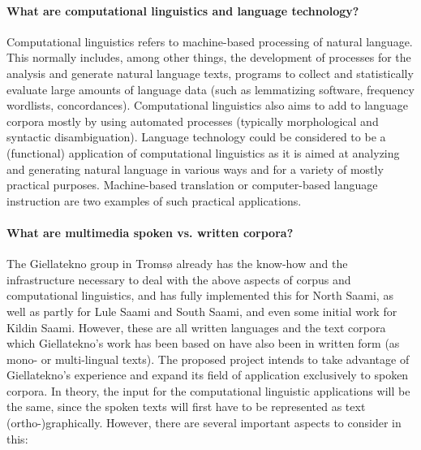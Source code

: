\documentclass[a4paper,12pt]{article}
\begin{document}
\paragraph{What are computational linguistics and language technology?} Computational linguistics refers to machine-based processing of natural language. This normally includes, among other things, the development of processes for the analysis and generate natural language texts, programs to collect and statistically evaluate large amounts of language data (such as lemmatizing software, frequency wordlists, concordances). Computational linguistics also aims to add to language corpora mostly by using automated processes (typically morphological and syntactic disambiguation). Language technology could be considered to be a (functional) application of computational linguistics as it is aimed at analyzing and generating natural language in various ways and for a variety of mostly practical purposes. Machine-based translation or computer-based language instruction are two examples of such practical applications.
 
\paragraph{What are multimedia spoken vs. written corpora?}
The Giellatekno group in Tromsø already has the know-how and the infrastructure necessary to deal with the above aspects of corpus and computational linguistics, and has fully implemented this for North Saami, as well as partly for Lule Saami and South Saami, and even some initial work for Kildin Saami. However, these are all written languages and the text corpora which Giellatekno's work has been based on have also been in written form (as mono- or multi-lingual texts). The proposed project intends to take advantage of Giellatekno's experience and expand its field of application exclusively to spoken corpora. In theory, the input for the computational linguistic applications will be the same, since the spoken texts will first have to be represented as text (ortho-)graphically. However, there are several important aspects to consider in this:
\end{document}
